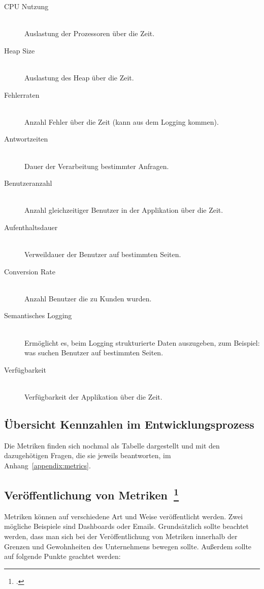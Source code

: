 \begin{description}
  \item[CPU Nutzung] \hfill \\ Auslastung der Prozessoren über die Zeit.
  \item[Heap Size] \hfill \\ Auslastung des Heap über die Zeit.
  \item[Fehlerraten] \hfill \\ Anzahl Fehler über die Zeit (kann aus dem Logging kommen).
  \item[Antwortzeiten] \hfill \\ Dauer der Verarbeitung bestimmter Anfragen.
  \item[Benutzeranzahl] \hfill \\ Anzahl gleichzeitiger Benutzer in der Applikation über die Zeit.
  \item[Aufenthaltsdauer] \hfill \\ Verweildauer der Benutzer auf bestimmten Seiten.
  \item[Conversion Rate] \hfill \\ Anzahl Benutzer die zu Kunden wurden.
  \item[Semantisches Logging] \hfill \\ Ermöglicht es, beim Logging strukturierte Daten auszugeben, zum Beispiel: was suchen Benutzer auf bestimmten Seiten.
  \item[Verfügbarkeit] \hfill \\ Verfügbarkeit der Applikation über die Zeit.
\end{description}

\subsection{Übersicht Kennzahlen im Entwicklungsprozess}

Die Metriken finden sich nochmal als Tabelle dargestellt und mit den dazugehötigen Fragen, die sie jeweils beantworten, im Anhang~\ref{appendix:metrics}.

\subsection[Veröffentlichung von Metriken]{Veröffentlichung von Metriken~\footcite[vgl.][S.177ff]{davis_agile_2015}}

Metriken können auf verschiedene Art und Weise veröffentlicht werden. Zwei mögliche Beispiele sind Dashboards oder Emails.
Grundsätzlich sollte beachtet werden, dass man sich bei der Veröffentlichung von Metriken innerhalb der Grenzen und Gewohnheiten des Unternehmens bewegen sollte.
Außerdem sollte auf folgende Punkte geachtet werden:


